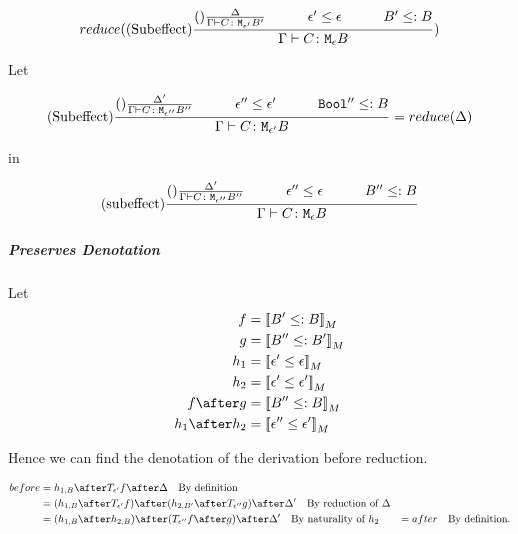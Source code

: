 {            \begin{equation}
                \reduce(\treerule{Subeffect}{\treerule{}{\D}{\gtyperelation{C}{\M{\e'}{B'}}}\s\s\e'\subeffect\e\s\s B'\subtype B}{\gtyperelation{C}{\meb}})
            \end{equation}

            Let 

            \begin{equation}
                \treerule{Subeffect}{
                    \treerule{}{\D'}{\gtyperelation{C}{\M{\e''}{B''}}}
                    \s\s
                    \e'' \subeffect \e'
                    \s\s
                    \B'' \subtype B
                }{
                    \gtyperelation{C}{\M{\e'}{B}}
                } = \reduce(\D)
            \end{equation}

            in

            \begin{equation}
                \treerule{subeffect}{
                    \treerule{}{\D'}{\gtyperelation{C}{\M{\e''}{B''}}}
                    \s\s
                    \e'' \subeffect \e
                    \s\s
                    B'' \subtype B
                }{
                    \gtyperelation{C}{\meb}
                }
            \end{equation}
            \subparagraph{Preserves Denotation}
                Let
                \begin{align}
                    f & = \deno{B' \subtype B}\\
                    g & = \deno{B'' \subtype B'}\\
                    h_1 & = \deno{\e' \subeffect \e}\\
                    h_2 & = \deno{\e' \subeffect \e'}\\
                    f\after g & = \deno{B'' \subtype B}\\
                    h_1\after h_2 & = \deno{\e'' \subeffect \e'}\\
                \end{align}

                Hence we can find the denotation of the derivation before reduction.

                \begin{align}
                    before & = h_{1, B} \after \T{\e'}{f} \after \D \quad\text{By definition}\\
                    & = (h_{1, B} \after \T{\e'}{f}) \after (h_{2, B'} \after \T{\e''}{g}) \after \D' \quad\text{By reduction of $\D$} \\
                    & = (h_{1, B}\after h_{2, B}) \after (\T{\e''}{f\after g})\after \D'\quad\text{By naturality of $h_2$}
                    & = after \quad\text{By definition.}
                \end{align}

}
